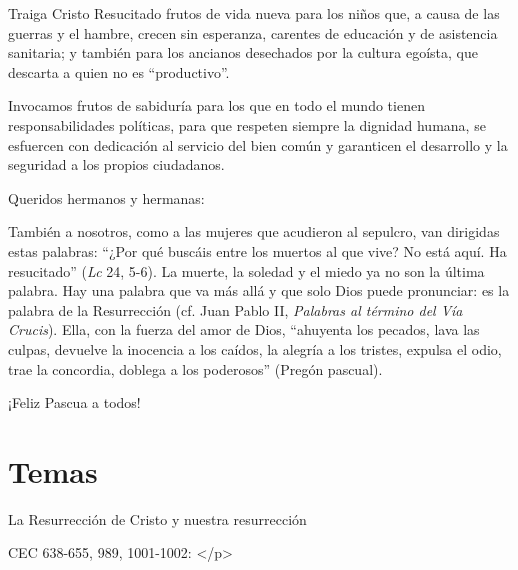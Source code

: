 			\begin{body}Traiga Cristo Resucitado frutos de vida nueva para los niños que, a causa de las guerras y el hambre, crecen sin esperanza, carentes de educación y de asistencia sanitaria; y también para los ancianos desechados por la cultura egoísta, que descarta a quien no es “productivo”.\end{body}
			
			\begin{body}Invocamos frutos de sabiduría para los que en todo el mundo tienen responsabilidades políticas, para que respeten siempre la dignidad humana, se esfuercen con dedicación al servicio del bien común y garanticen el desarrollo y la seguridad a los propios ciudadanos.\end{body}
			
			\begin{body}Queridos hermanos y hermanas:\end{body}
			
			\begin{body}También a nosotros, como a las mujeres que acudieron al sepulcro, van dirigidas estas palabras: “¿Por qué buscáis entre los muertos al que vive? No está aquí. Ha resucitado” (\textit{Lc} 24, 5-6). La muerte, la soledad y el miedo ya no son la última palabra. Hay una palabra que va más allá y que solo Dios puede pronunciar: es la palabra de la Resurrección (cf. Juan Pablo II, \textit{Palabras al término del Vía Crucis}). Ella, con la fuerza del amor de Dios, “ahuyenta los pecados, lava las culpas, devuelve la inocencia a los caídos, la alegría a los tristes, expulsa el odio, trae la concordia, doblega a los poderosos” (Pregón pascual).\end{body}
			
			\begin{body}¡Feliz Pascua a todos!\end{body}
			
			\section{Temas}
			
			\begin{ccetheme}La Resurrección de Cristo y nuestra resurrección \end{ccetheme}
			
			\begin{ccereference}\end{ccereference}CEC 638-655, 989, 1001-1002: </p>
			
